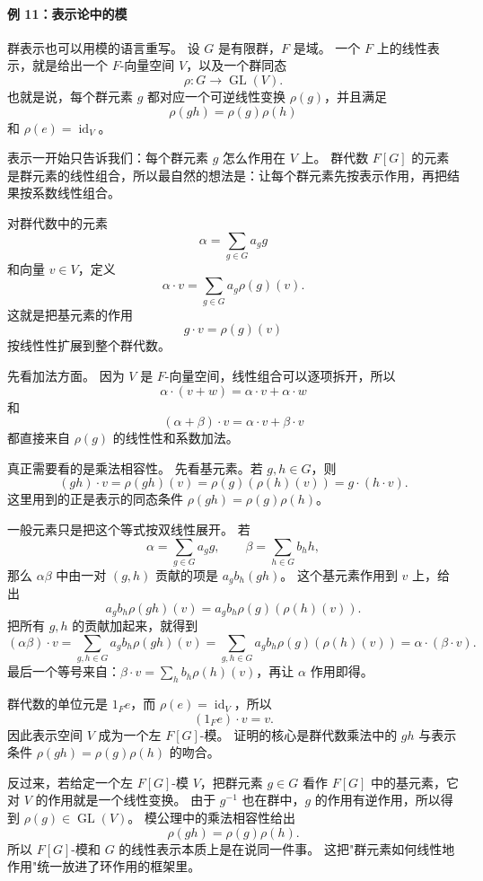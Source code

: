 \paragraph*{例 11：表示论中的模}
群表示也可以用模的语言重写。
设 $G$ 是有限群，$F$ 是域。
一个 $F$ 上的线性表示，就是给出一个 $F$-向量空间 $V$，以及一个群同态
\[
\rho:G\to \operatorname{GL}(V).
\]
也就是说，每个群元素 $g$ 都对应一个可逆线性变换 $\rho(g)$，并且满足
\[
\rho(gh)=\rho(g)\rho(h)
\]
和 $\rho(e)=\operatorname{id}_V$。

表示一开始只告诉我们：每个群元素 $g$ 怎么作用在 $V$ 上。
群代数 $F[G]$ 的元素是群元素的线性组合，所以最自然的想法是：让每个群元素先按表示作用，再把结果按系数线性组合。

对群代数中的元素
\[
\alpha=\sum_{g\in G}a_g g
\]
和向量 $v\in V$，定义
\[
\alpha\cdot v=\sum_{g\in G}a_g\rho(g)(v).
\]
这就是把基元素的作用
\[
g\cdot v=\rho(g)(v)
\]
按线性性扩展到整个群代数。

先看加法方面。
因为 $V$ 是 $F$-向量空间，线性组合可以逐项拆开，所以
\[
\alpha\cdot(v+w)=\alpha\cdot v+\alpha\cdot w
\]
和
\[
(\alpha+\beta)\cdot v=\alpha\cdot v+\beta\cdot v
\]
都直接来自 $\rho(g)$ 的线性性和系数加法。

真正需要看的是乘法相容性。
先看基元素。若 $g,h\in G$，则
\[
(gh)\cdot v=\rho(gh)(v)=\rho(g)(\rho(h)(v))=g\cdot(h\cdot v).
\]
这里用到的正是表示的同态条件 $\rho(gh)=\rho(g)\rho(h)$。

一般元素只是把这个等式按双线性展开。
若
\[
\alpha=\sum_{g\in G}a_g g,\qquad \beta=\sum_{h\in G}b_h h,
\]
那么 $\alpha\beta$ 中由一对 $(g,h)$ 贡献的项是 $a_gb_h(gh)$。
这个基元素作用到 $v$ 上，给出
\[
a_gb_h\rho(gh)(v)=a_gb_h\rho(g)(\rho(h)(v)).
\]
把所有 $g,h$ 的贡献加起来，就得到
\[
(\alpha\beta)\cdot v
=\sum_{g,h\in G}a_gb_h\rho(gh)(v)
=\sum_{g,h\in G}a_gb_h\rho(g)(\rho(h)(v))
=\alpha\cdot(\beta\cdot v).
\]
最后一个等号来自：$\beta\cdot v=\sum_h b_h\rho(h)(v)$，再让 $\alpha$ 作用即得。

群代数的单位元是 $1_F e$，而 $\rho(e)=\operatorname{id}_V$，所以
\[
(1_F e)\cdot v=v.
\]
因此表示空间 $V$ 成为一个左 $F[G]$-模。
证明的核心是群代数乘法中的 $gh$ 与表示条件 $\rho(gh)=\rho(g)\rho(h)$ 的吻合。

反过来，若给定一个左 $F[G]$-模 $V$，把群元素 $g\in G$ 看作 $F[G]$ 中的基元素，它对 $V$ 的作用就是一个线性变换。
由于 $g^{-1}$ 也在群中，$g$ 的作用有逆作用，所以得到 $\rho(g)\in\operatorname{GL}(V)$。
模公理中的乘法相容性给出
\[
\rho(gh)=\rho(g)\rho(h).
\]
所以 $F[G]$-模和 $G$ 的线性表示本质上是在说同一件事。
这把"群元素如何线性地作用"统一放进了环作用的框架里。

